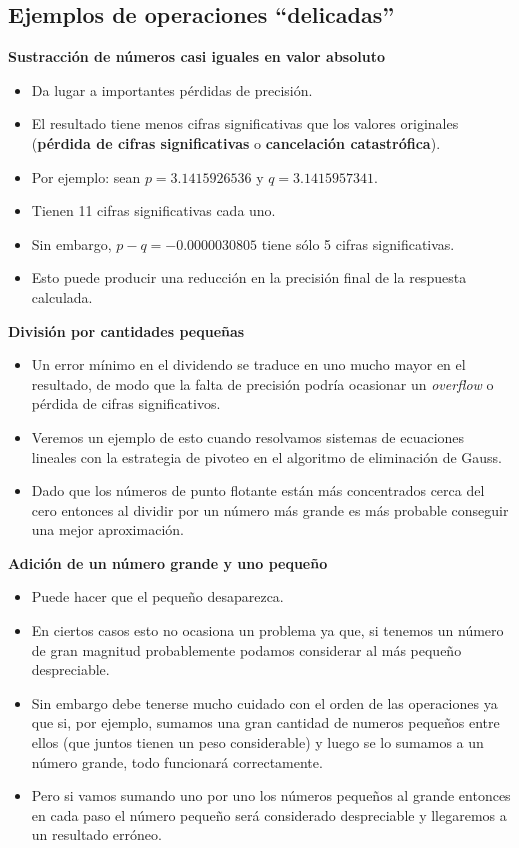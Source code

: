\documentclass[]{book}
\providecommand{\tightlist}{%
  \setlength{\itemsep}{0pt}\setlength{\parskip}{0pt}}
\begin{document}
\hypertarget{ejemplos-de-operaciones-delicadas}{%
\subsection{Ejemplos de operaciones ``delicadas''}\label{ejemplos-de-operaciones-delicadas}}

\textbf{Sustracción de números casi iguales en valor absoluto}

\begin{itemize}
\tightlist
\item
  Da lugar a importantes pérdidas de precisión.
\item
  El resultado tiene menos cifras significativas que los valores originales (\textbf{pérdida de cifras significativas} o \textbf{cancelación catastrófica}).
\item
  Por ejemplo: sean \(p = 3.1415926536\) y \(q = 3.1415957341\).
\item
  Tienen 11 cifras significativas cada uno.
\item
  Sin embargo, \(p - q = -0.0000030805\) tiene sólo 5 cifras significativas.
\item
  Esto puede producir una reducción en la precisión final de la respuesta calculada.
\end{itemize}

\textbf{División por cantidades pequeñas}

\begin{itemize}
\tightlist
\item
  Un error mínimo en el dividendo se traduce en uno mucho mayor en el resultado, de modo que la falta de precisión podría ocasionar un \emph{overflow} o pérdida de cifras significativos.
\item
  Veremos un ejemplo de esto cuando resolvamos sistemas de ecuaciones lineales con la estrategia de pivoteo en el algoritmo de eliminación de Gauss.
\item
  Dado que los números de punto flotante están más concentrados cerca del cero entonces al dividir por un número más grande es más probable conseguir una mejor aproximación.
\end{itemize}

\textbf{Adición de un número grande y uno pequeño}

\begin{itemize}
\tightlist
\item
  Puede hacer que el pequeño desaparezca.
\item
  En ciertos casos esto no ocasiona un problema ya que, si tenemos un número de gran magnitud probablemente podamos considerar al más pequeño despreciable.
\item
  Sin embargo debe tenerse mucho cuidado con el orden de las operaciones ya que si, por ejemplo, sumamos una gran cantidad de numeros pequeños entre ellos (que juntos tienen un peso considerable) y luego se lo sumamos a un número grande, todo funcionará correctamente.
\item
  Pero si vamos sumando uno por uno los números pequeños al grande entonces en cada paso el número pequeño será considerado despreciable y llegaremos a un resultado erróneo.
\end{itemize}
\end{document}
